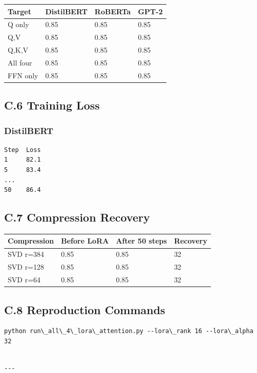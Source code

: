 \begin{table}[H]
\centering
\small
\begin{tabular}{llll}
\toprule
\textbf{Target} & \textbf{DistilBERT} & \textbf{RoBERTa} & \textbf{GPT-2} \\
\midrule
Q only & 0.85 & 0.85 & 0.85 \\
Q,V & 0.85 & 0.85 & 0.85 \\
Q,K,V & 0.85 & 0.85 & 0.85 \\
All four & 0.85 & 0.85 & 0.85 \\
FFN only & 0.85 & 0.85 & 0.85 \\
\bottomrule
\end{tabular}
\end{table}

\subsection{C.6 Training Loss}

\subsubsection{DistilBERT}
\begin{lstlisting}
Step  Loss
1     82.1
5     83.4
...
50    86.4
\end{lstlisting}

\subsection{C.7 Compression Recovery}

\begin{table}[H]
\centering
\small
\begin{tabular}{llll}
\toprule
\textbf{Compression} & \textbf{Before LoRA} & \textbf{After 50 steps} & \textbf{Recovery} \\
\midrule
SVD r=384 & 0.85 & 0.85 & 32 \\
SVD r=128 & 0.85 & 0.85 & 32 \\
SVD r=64 & 0.85 & 0.85 & 32 \\
\bottomrule
\end{tabular}
\end{table}

\subsection{C.8 Reproduction Commands}

\begin{lstlisting}
python run\_all\_4\_lora\_attention.py --lora\_rank 16 --lora\_alpha 32
\end{lstlisting}
\begin{lstlisting}

---
\end{lstlisting}

